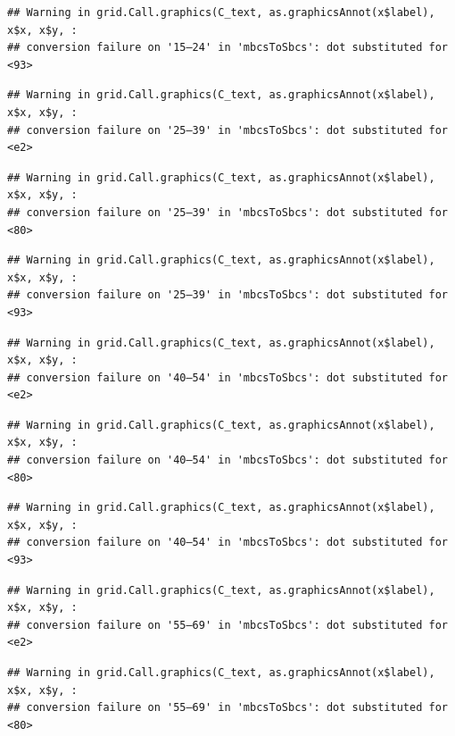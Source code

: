 \documentclass[
]{article}
\begin{document}
\begin{verbatim}
## Warning in grid.Call.graphics(C_text, as.graphicsAnnot(x$label), x$x, x$y, :
## conversion failure on '15–24' in 'mbcsToSbcs': dot substituted for <93>
\end{verbatim}

\begin{verbatim}
## Warning in grid.Call.graphics(C_text, as.graphicsAnnot(x$label), x$x, x$y, :
## conversion failure on '25–39' in 'mbcsToSbcs': dot substituted for <e2>
\end{verbatim}

\begin{verbatim}
## Warning in grid.Call.graphics(C_text, as.graphicsAnnot(x$label), x$x, x$y, :
## conversion failure on '25–39' in 'mbcsToSbcs': dot substituted for <80>
\end{verbatim}

\begin{verbatim}
## Warning in grid.Call.graphics(C_text, as.graphicsAnnot(x$label), x$x, x$y, :
## conversion failure on '25–39' in 'mbcsToSbcs': dot substituted for <93>
\end{verbatim}

\begin{verbatim}
## Warning in grid.Call.graphics(C_text, as.graphicsAnnot(x$label), x$x, x$y, :
## conversion failure on '40–54' in 'mbcsToSbcs': dot substituted for <e2>
\end{verbatim}

\begin{verbatim}
## Warning in grid.Call.graphics(C_text, as.graphicsAnnot(x$label), x$x, x$y, :
## conversion failure on '40–54' in 'mbcsToSbcs': dot substituted for <80>
\end{verbatim}

\begin{verbatim}
## Warning in grid.Call.graphics(C_text, as.graphicsAnnot(x$label), x$x, x$y, :
## conversion failure on '40–54' in 'mbcsToSbcs': dot substituted for <93>
\end{verbatim}

\begin{verbatim}
## Warning in grid.Call.graphics(C_text, as.graphicsAnnot(x$label), x$x, x$y, :
## conversion failure on '55–69' in 'mbcsToSbcs': dot substituted for <e2>
\end{verbatim}

\begin{verbatim}
## Warning in grid.Call.graphics(C_text, as.graphicsAnnot(x$label), x$x, x$y, :
## conversion failure on '55–69' in 'mbcsToSbcs': dot substituted for <80>
\end{verbatim}
\end{document}
